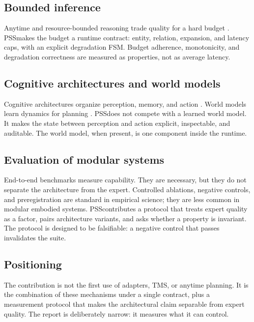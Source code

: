 \documentclass[10pt]{article}
\newcommand{\pss}{PSS}
\begin{document}
\subsection{Bounded inference}

Anytime and resource-bounded reasoning trade quality for a hard budget
\citep{zilberstein1996anytime}. \pss makes the budget a runtime contract:
entity, relation, expansion, and latency caps, with an explicit degradation
FSM. Budget adherence, monotonicity, and degradation correctness are measured
as properties, not as average latency.

\subsection{Cognitive architectures and world models}

Cognitive architectures organize perception, memory, and action
\citep{eliasmith2012spaun,sumers2024coala}. World models learn dynamics for
planning \citep{hafner2023dreamerv3,bardes2024vjepa}. \pss does not compete with
a learned world model. It makes the state between perception and action
explicit, inspectable, and auditable. The world model, when present, is one
component inside the runtime.

\subsection{Evaluation of modular systems}

End-to-end benchmarks measure capability. They are necessary, but they do not
separate the architecture from the expert. Controlled ablations, negative
controls, and preregistration are standard in empirical science; they are less
common in modular embodied systems. \pss contributes a protocol that treats
expert quality as a factor, pairs architecture variants, and asks whether a
property is invariant. The protocol is designed to be falsifiable: a negative
control that passes invalidates the suite.

\subsection{Positioning}

The contribution is not the first use of adapters, TMS, or anytime planning.
It is the combination of these mechanisms under a single contract, plus a
measurement protocol that makes the architectural claim separable from expert
quality. The report is deliberately narrow: it measures what it can control.
\end{document}

